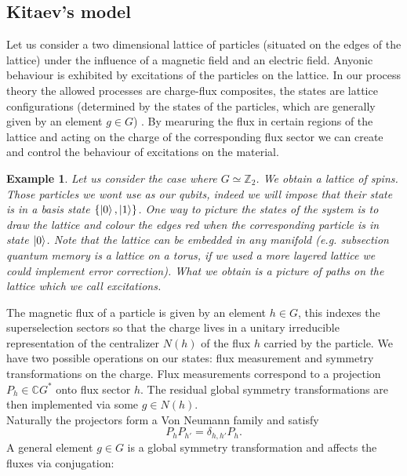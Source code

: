 \documentclass{article}
\newtheorem{example}{Example}
\begin{document}
\subsection{Kitaev's model}
Let us consider a two dimensional lattice of particles (situated on the edges of the lattice) under the influence of a magnetic field and an electric field. Anyonic behaviour is exhibited by excitations of the particles on the lattice. In our process theory the allowed processes are charge-flux composites, the states are lattice configurations (determined by the states of the particles, which are generally given by an element $g \in G$)  . By mearuring the flux in certain regions of the lattice and acting on the charge of the corresponding flux sector we can create and control the behaviour of excitations on the material.
\begin{example}
	Let us consider the case where $G \simeq \mathbb{Z}_2$. We obtain a lattice of spins. Those particles we wont use as our qubits, indeed we will impose that their state is in a basis state $\{\ket{0},\ket{1}\}$. One way to picture the states of the system is to draw the lattice and colour the edges red when the corresponding particle is in state $\ket{0}$. Note that the lattice can be embedded in any manifold (e.g. subsection quantum memory is a lattice on a torus, if we used a more layered lattice we could implement error correction). What we obtain is a picture of paths on the lattice which we call excitations.
\end{example}
The magnetic flux of a particle is given by an element $h \in G$, this indexes the superselection sectors so that the charge lives in a unitary irreducible representation of the centralizer $N(h)$ of the flux $h$ carried by the particle. We have two possible operations on our states: flux measurement and symmetry transformations on the charge. Flux measurements correspond to a projection $P_h \in \mathbb{C}G^*$ onto flux sector $h$. The residual global symmetry transformations are then implemented via some $g \in N(h)$. \\
Naturally the projectors form a Von Neumann family and satisfy 
$$P_hP_{h'}= \delta_{h,h'} P_h.$$ 
A general element $g \in G$ is a global symmetry transformation and affects the fluxes via conjugation:
\end{document}
